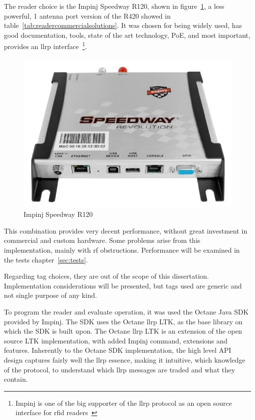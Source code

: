 The reader choice is the Impinj Speedway R120, shown in figure~\ref{fig:impinjr120}, a less powerful, 1 antenna port version of the R420 showed in table~\ref{tab:readercommercialsolutions}. It was chosen for being widely used, has good documentation, tools, state of the art technology, PoE, and most important, provides an \ac{llrp} interface~\footnote{Impinj is one of the big supporter of the \ac{llrp} protocol as an open source interface for \ac{rfid} readers~\cite{SevenRFIDOrganizations}}.

\begin{figure}
    \centering
    \includegraphics[width=0.6\linewidth]{./figs/Speedway_Revolution_R120.jpg}
    \caption{Impinj Speedway R120~\cite{ImpinjSolucoesRAIN}} 
    \label{fig:impinjr120}
\end{figure}

This combination provides very decent performance, without great investment in commercial and custom hardware. Some problems arise from this implementation, mainly with \ac{rf} obstructions. Performance will be examined in the tests chapter~\ref{sec:tests}.  

Regarding tag choices, they are out of the scope of this dissertation. Implementation considerations will be presented, but tags used are generic and not single purpose of any kind.

To program the reader and evaluate operation, it was used the Octane Java SDK provided by Impinj. 
The SDK uses the Octane \ac{llrp} LTK, as the base library on which the SDK is built upon. The Octane \ac{llrp} LTK is an extension of the open source LTK implementation, with added Impinj command, extensions and features.
Inherently to the Octane SDK implementation, the high level API design captures fairly well the \ac{llrp} essence, making it intuitive, which knowledge of the protocol, to understand which \ac{llrp} messages are traded and what they contain.

